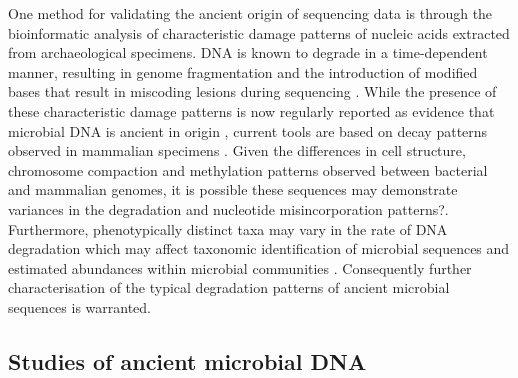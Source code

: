 \documentclass[12pt, a4paper]{article}
\begin{document}
%
One method for validating the ancient origin of sequencing data is through the bioinformatic analysis of characteristic damage patterns of nucleic acids extracted from archaeological specimens.  
DNA is known to degrade in a time-dependent manner, resulting in genome fragmentation \cite{Allentoft:2012aa} and the introduction of modified bases that result in miscoding lesions during sequencing \cite{Briggs:2007aa,Brotherton:2007aa,Hofreiter:2001aa}. 
While the presence of these characteristic damage patterns is now regularly reported as evidence that microbial DNA is ancient in origin \cite{Bos:2015aa,Weyrich:2017aa,Warinner:2014aa}, current tools are based on decay patterns observed in mammalian specimens \cite{Briggs:2007aa,Jonsson:2013aa}.
Given the differences in cell structure, chromosome compaction and methylation patterns observed between bacterial and mammalian genomes, it is possible these sequences may demonstrate variances in the degradation and nucleotide misincorporation patterns\cite{Der-Sarkissian:2014aa}?.
Furthermore, phenotypically distinct taxa may vary in the rate of DNA degradation which may affect taxonomic identification of microbial sequences and estimated abundances within microbial communities \cite{Adler:2013aa,Weyrich:2017aa}.
Consequently further characterisation of the typical degradation patterns of ancient microbial sequences is warranted.


\subsection{Studies of ancient microbial DNA}
\end{document}
